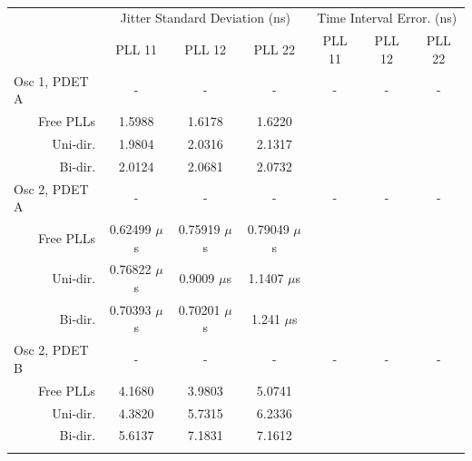 \documentclass[conference]{IEEEtran}
\newcommand\T{\rule{0pt}{2.6ex}}       %
\newcommand\B{\rule[-1.2ex]{0pt}{0pt}} %
\begin{document}
\begin{table}[!ht]
	\begin{center}
		\begin{tiny}
			\begin{tabular}{cc|c|c|c|c|c|c|}           
				\cline{3-8}
				&& \multicolumn{3}{c|}{Jitter Standard Deviation (ns)} & \multicolumn{3}{c|}{Time Interval Error. (ns)} \T\\
				\cline{3-8}	
				&&PLL 11&PLL 12&PLL 22&PLL 11&PLL 12&PLL 22\T\\
				\hline
				\multicolumn{2}{|l|}{Osc 1, PDET A}&-&-&-&-&-&-\T\\
				\multicolumn{2}{|r|}{Free PLLs}&1.5988&1.6178&1.6220&&& \T\\
				\multicolumn{2}{|r|}{Uni-dir.}&1.9804&2.0316&2.1317&&& \T\\
				\multicolumn{2}{|r|}{Bi-dir.}&2.0124&2.0681&2.0732&&& \T\\
				\hline
				\multicolumn{2}{|l|}{Osc 2, PDET A}&-&-&-&-&-&-\T\\
				\multicolumn{2}{|r|}{Free PLLs}&0.62499 $\mu$s&0.75919 $\mu$s&0.79049  $\mu$s&&& \T\\
				\multicolumn{2}{|r|}{Uni-dir.}&0.76822 $\mu$s&0.9009 $\mu$s&1.1407 $\mu$s&&& \T\\
				\multicolumn{2}{|r|}{Bi-dir.}&0.70393 $\mu$s&0.70201 $\mu$s&1.241 $\mu$s&&& \T\\
				\hline
				\multicolumn{2}{|l|}{Osc 2, PDET B}&-&-&-&-&-&-\T\\
				\multicolumn{2}{|r|}{Free PLLs}&4.1680&3.9803&5.0741&&& \T\\
				\multicolumn{2}{|r|}{Uni-dir.}&4.3820&5.7315&6.2336 &&& \T\\
				\multicolumn{2}{|r|}{Bi-dir.}&5.6137&7.1831&7.1612 &&& \T\\
				\hline
				\B
			\end{tabular}
		\end{tiny}
		\caption{}
		\label{table:b_c_perf}
	\end{center}
\end{table}
\end{document}
